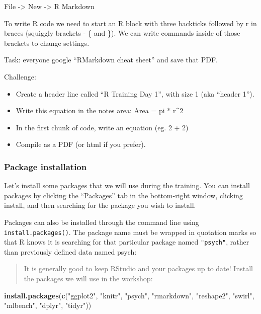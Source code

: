 \documentclass[]{article}
\newenvironment{Shaded}{\begin{snugshade}}{\end{snugshade}}
\newcommand{\KeywordTok}[1]{\textcolor[rgb]{0.13,0.29,0.53}{\textbf{#1}}}
\newcommand{\StringTok}[1]{\textcolor[rgb]{0.31,0.60,0.02}{#1}}
\newcommand{\NormalTok}[1]{#1}
\providecommand{\tightlist}{%
  \setlength{\itemsep}{0pt}\setlength{\parskip}{0pt}}
\begin{document}
File -\textgreater{} New -\textgreater{} R Markdown

To write R code we need to start an R block with three backticks
followed by r in braces (squiggly brackets - \{ and \}). We can write
commands inside of those brackets to change settings.

Task: everyone google ``RMarkdown cheat sheet'' and save that PDF.

Challenge:

\begin{itemize}
\tightlist
\item
  Create a header line called ``R Training Day 1'', with size 1 (aka
  ``header 1'').
\item
  Write this equation in the notes area: Area = pi * r\^{}2
\item
  In the first chunk of code, write an equation (eg. 2 + 2)
\item
  Compile as a PDF (or html if you prefer).
\end{itemize}

\subsubsection{Package installation}\label{package-installation}

Let's install some packages that we will use during the training. You
can install packages by clicking the ``Packages'' tab in the
bottom-right window, clicking install, and then searching for the
package you wish to install.

Packages can also be installed through the command line using
\texttt{install.packages()}. The package name must be wrapped in
quotation marks so that R knows it is searching for that particular
package named \texttt{"psych"}, rather than previously defined data
named psych:

\begin{quote}
It is generally good to keep RStudio and your packages up to date!
Install the packages we will use in the workshop:
\end{quote}

\begin{Shaded}
\begin{Highlighting}[]
\KeywordTok{install.packages}\NormalTok{(}\KeywordTok{c}\NormalTok{(}\StringTok{"ggplot2"}\NormalTok{, }\StringTok{"knitr"}\NormalTok{, }\StringTok{"psych"}\NormalTok{, }\StringTok{"rmarkdown"}\NormalTok{, }\StringTok{"reshape2"}\NormalTok{, }\StringTok{"swirl"}\NormalTok{, }\StringTok{"mlbench"}\NormalTok{, }\StringTok{"dplyr"}\NormalTok{, }\StringTok{"tidyr"}\NormalTok{))}
\end{Highlighting}
\end{Shaded}
\end{document}
